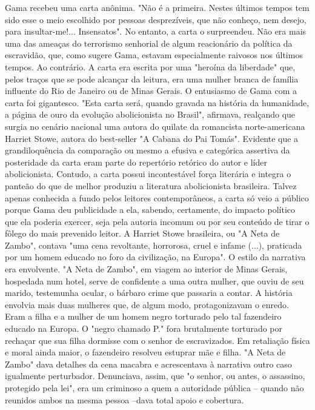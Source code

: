 {\small\noindent
Gama recebeu uma carta anônima. "Não é a primeira. Nestes últimos
tempos tem sido esse o meio escolhido por pessoas desprezíveis, que não
conheço, nem desejo, para insultar-me!... Insensatos". No entanto, a
carta o surpreendeu. Não era mais uma das ameaças do terrorismo
senhorial de algum reacionário da política da escravidão, que, como
sugere Gama, estavam especialmente raivosos nos últimos tempos. Ao
contrário. A carta era escrita por uma "heroína da liberdade" que, pelos
traços que se pode alcançar da leitura, era uma mulher branca de família
influente do Rio de Janeiro ou de Minas Gerais. O entusiasmo de Gama com
a carta foi gigantesco. "Esta carta será, quando gravada na história da
humanidade, a página de ouro da evolução abolicionista no Brasil",
afirmava, realçando que surgia no cenário nacional uma autora do quilate
da romancista norte-americana Harriet Stowe, autora do best-seller "A
Cabana do Pai Tomás". Evidente que a grandiloquência da comparação ou
mesmo a efusiva e categórica assertiva da posteridade da carta eram
parte do repertório retórico do autor e líder abolicionista. Contudo, a
carta possui incontestável força literária e integra o panteão do que de
melhor produziu a literatura abolicionista brasileira. Talvez apenas
conhecida a fundo pelos leitores contemporâneos, a carta só veio a
público porque Gama deu publicidade a ela, sabendo, certamente, do
impacto político que ela poderia exercer, seja pela autoria incomum ou
por seu conteúdo de tirar o fôlego do mais prevenido leitor. A Harriet
Stowe brasileira, ou "A Neta de Zambo", contava "uma cena revoltante,
horrorosa, cruel e infame (...), praticada por um homem educado no foro
da civilização, na Europa". O estilo da narrativa era envolvente. "A
Neta de Zambo", em viagem ao interior de Minas Gerais, hospedada num
hotel, serve de confidente a uma outra mulher, que ouviu de seu marido,
testemunha ocular, o bárbaro crime que passaria a contar. A história
envolvia mais duas mulheres que, de algum modo, protagonizavam o enredo.
Eram a filha e a mulher de um homem negro torturado pelo tal fazendeiro
educado na Europa. O "negro chamado P." fora brutalmente torturado por
rechaçar que sua filha dormisse com o senhor de escravizados. Em
retaliação física e moral ainda maior, o fazendeiro resolveu estuprar
mãe e filha. "A Neta de Zambo" dava detalhes da cena macabra e
acrescentava à narrativa outro caso igualmente perturbador. Denunciava,
assim, que "o senhor, ou antes, o assassino, protegido pela lei", era um
criminoso a quem a autoridade pública -- quando não reunidos ambos na
mesma pessoa --dava total apoio e cobertura. }


